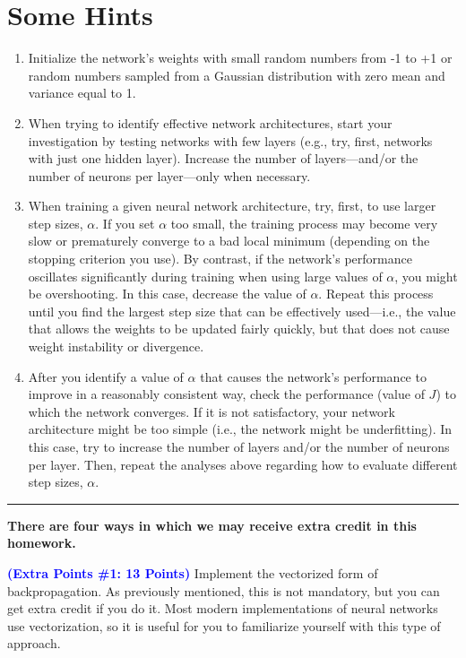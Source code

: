 \documentclass[letterpaper]{article}
\newcommand{\HIGHLIGHT}[1]{\textcolor{blue}{\textbf{#1}}}
\begin{document}
\section{Some Hints}

\begin{enumerate}
    \item Initialize the network's weights with small random numbers from -1 to +1 or random numbers sampled from a Gaussian distribution with zero mean and variance equal to 1.
    \item When trying to identify effective network architectures, start your investigation by testing networks with few layers (e.g., try, first, networks with just one hidden layer). Increase the number of layers---and/or the number of neurons per layer---only when necessary.
    \item When training a given neural network architecture, try, first, to use larger step sizes, $\alpha$. If you set $\alpha$ too small, the training process may become very slow or prematurely converge to a bad local minimum (depending on the stopping criterion you use). By contrast, if the network's performance oscillates significantly during training when using large values of $\alpha$, you might be overshooting. In this case, decrease the value of $\alpha$. Repeat this process until you find the largest step size that can be effectively used---i.e., the value that allows the weights to be updated fairly quickly, but that does not cause weight instability or divergence.
    \item After you identify a value of $\alpha$ that causes the network's performance to improve in a reasonably consistent way, check the performance (value of $J$) to which the network converges. If it is not satisfactory, your network architecture might be too simple (i.e., the network might be underfitting). In this case, try to increase the number of layers and/or the number of neurons per layer. Then, repeat the analyses above regarding how to evaluate different step sizes, $\alpha$.

\end{enumerate}


\vspace{1cm}
\noindent\rule{\textwidth}{1pt}

\textbf{There are four ways in which we may receive extra credit in this homework.}

\noindent \HIGHLIGHT{(Extra Points \#1: 13 Points)} 
Implement the vectorized form of backpropagation. As previously mentioned, this is not mandatory, but you can get extra credit if you do it. Most modern implementations of neural networks use vectorization, so it is useful for you to familiarize yourself with this type of approach. \\
\end{document}
